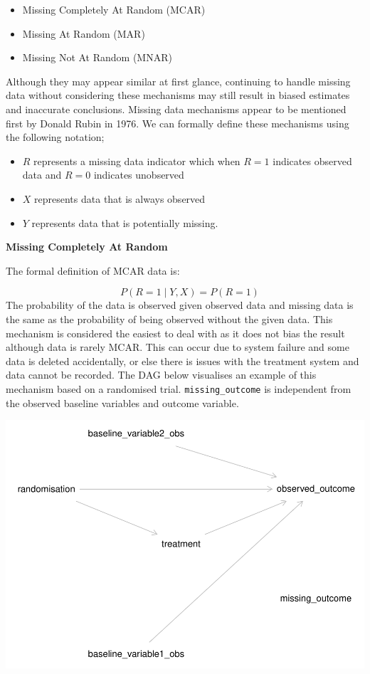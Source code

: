 \documentclass{article}
\providecommand{\tightlist}{%
  \setlength{\itemsep}{0pt}\setlength{\parskip}{0pt}}
\newcommand{\pandocbounded}[1]{#1}
\begin{document}
\begin{itemize}
\tightlist
\item
  Missing Completely At Random (MCAR)
\item
  Missing At Random (MAR)
\item
  Missing Not At Random (MNAR)
\end{itemize}

Although they may appear similar at first glance, continuing to handle
missing data without considering these mechanisms may still result in
biased estimates and inaccurate conclusions. Missing data mechanisms
appear to be mentioned first by Donald Rubin in 1976. We can formally
define these mechanisms using the following notation;

\begin{itemize}
\tightlist
\item
  \(R\) represents a missing data indicator which when \(R=1\) indicates
  observed data and \(R=0\) indicates unobserved
\item
  \(X\) represents data that is always observed
\item
  \(Y\) represents data that is potentially missing.
\end{itemize}

\textbf{Missing Completely At Random}

The formal definition of MCAR data is:

\[\quad P(R = 1 \mid Y, X) = P(R = 1)\] The probability of the data is
observed given observed data and missing data is the same as the
probability of being observed without the given data. This mechanism is
considered the easiest to deal with as it does not bias the result
although data is rarely MCAR. This can occur due to system failure and
some data is deleted accidentally, or else there is issues with the
treatment system and data cannot be recorded. The DAG below visualises
an example of this mechanism based on a randomised trial.
\texttt{missing\_outcome} is independent from the observed baseline
variables and outcome variable.

\pandocbounded{\includegraphics[keepaspectratio]{Final_Report_files/figure-latex/unnamed-chunk-1-1.pdf}}
\end{document}
